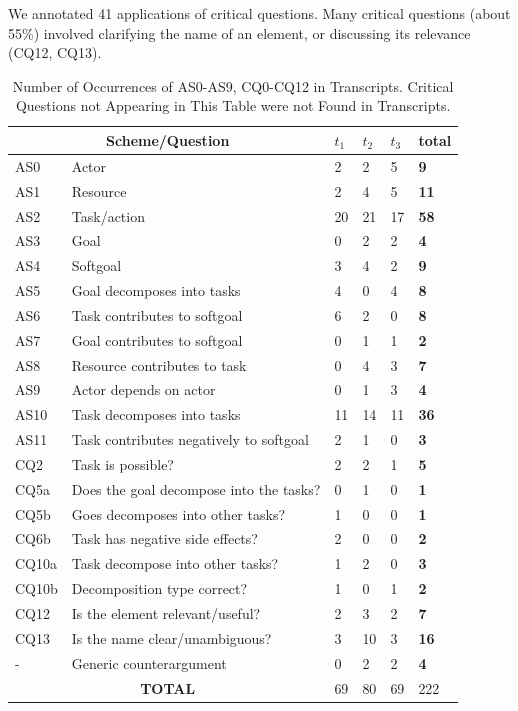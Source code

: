 We annotated 41 applications of critical questions. Many critical questions (about 55\%) involved clarifying the name of an element, or discussing its relevance (CQ12, CQ13).

\begin{table}[ht]
\centering
\begin{tabularx}{0.5\textwidth}{|l|X|l|l|l|>{\bfseries}l|}
\hline
\multicolumn{2}{|c|}{\textbf{Scheme/Question}} & $t_1$ & $t_2$ & $t_3$ & \textbf{total}\\
\hline 
AS0 & Actor & 2 & 2 & 5 & 9\\
\hline
AS1 & Resource & 2 & 4 & 5 & 11\\
\hline
AS2 & Task/action & 20 & 21 & 17 & 58\\
\hline
AS3 & Goal & 0 & 2 & 2 & 4\\
\hline
AS4 & Softgoal & 3 & 4 & 2 & 9\\
\hline
AS5 & Goal decomposes into tasks & 4 &0& 4 & 8\\
\hline
AS6 & Task contributes to softgoal & 6 & 2 &0& 8\\
\hline
AS7 & Goal contributes to softgoal &0& 1 & 1 & 2\\
\hline
AS8 & Resource contributes to task & 0 & 4 & 3 & 7\\
\hline
AS9 & Actor depends on actor &0& 1 & 3 & 4\\
\hline
AS10 & Task decomposes into tasks & 11 &14 &11 &36\\ 
\hline
AS11 & Task contributes negatively to softgoal & 2 & 1 & 0 & 3\\
\hline
\hline
CQ2 & Task is possible? & 2 & 2 & 1 & 5\\
\hline		
CQ5a & Does the goal decompose into the tasks? & 0 & 1 & 0 & 1\\
\hline
CQ5b & Goes decomposes into other tasks? & 1 & 0 & 0 & 1\\
\hline
CQ6b & Task has negative side effects? & 2 & 0 & 0 & 2\\
\hline
CQ10a & Task decompose into other tasks? & 1 &2 &0&3\\
\hline
CQ10b & Decomposition type correct? &1 &0& 1 &2\\
\hline
\hline
CQ12 & Is the element relevant/useful? & 2 & 3 & 2 &7\\
\hline
CQ13 & Is the name clear/unambiguous? &3 &10 & 3 & 16\\
\hline
\hline
- & Generic counterargument & 0& 2 & 2 & 4\\
\hline
\hline
\multicolumn{2}{|c|}{\textbf{TOTAL}}&69&80&69&222\\
\hline
\end{tabularx}
\caption{Number of Occurrences of AS0-AS9, CQ0-CQ12 in Transcripts. Critical Questions not Appearing in This Table were not Found in Transcripts.}
\label{table:transcripts:results:argumentschemes}
\end{table}

